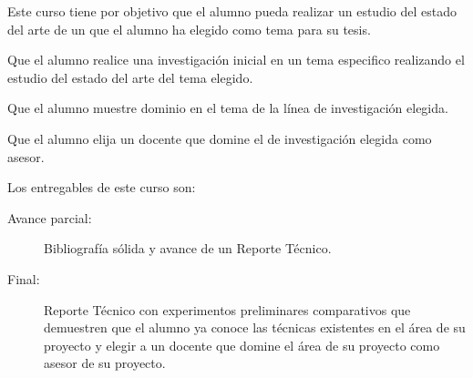 \begin{syllabus}


\begin{justification}
Este curso tiene por objetivo que el alumno pueda realizar un estudio del estado del arte de un que el alumno ha elegido como tema para su tesis.
\end{justification}

\begin{goals}
\item Que el alumno realice una investigación inicial en un tema especifico realizando el estudio del estado del arte del tema elegido.
\item Que el alumno muestre dominio en el tema de la línea de investigación elegida.
\item Que el alumno elija un docente que domine el de investigación elegida como asesor. 
\item Los entregables de este curso son:
	\begin{description}
		\item [Avance parcial:] Bibliografía sólida y avance de un Reporte Técnico.
		\item [Final:] Reporte Técnico con experimentos preliminares comparativos que demuestren que el alumno ya conoce las técnicas existentes en el área de su proyecto y elegir a un docente que domine el área de su proyecto como asesor de su proyecto.
	\end{description}
\end{goals}

\begin{outcomes}
\end{outcomes}


\end{syllabus}
